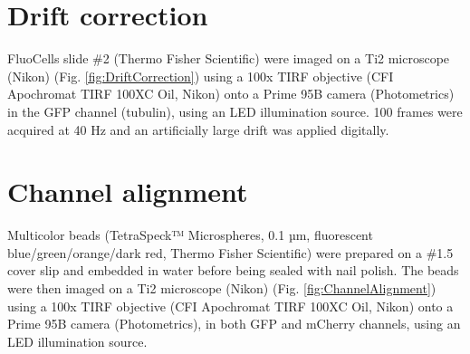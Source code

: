 

\onecolumn %
\fancyhead{} %
\renewcommand{\floatpagefraction}{0.1}
\lfoot[\bSupInf]{\dAuthor}
\rfoot[\dAuthor]{\cSupInf}
\newpage

\captionsetup*{format=largeformat} %
\setcounter{figure}{0} %
\setcounter{equation}{0} %
\setcounter{table}{0} %
\setcounter{page}{1} %
\makeatletter
\renewcommand{\thefigure}{S\@arabic\c@figure} %
\makeatother
\makeatletter
\renewcommand{\thetable}{S\@arabic\c@table} %
\makeatother
\makeatletter
\renewcommand{\theequation}{S\@arabic\c@equation} %
\makeatother




\tableofcontents

\newpage
\section{Drift correction}
FluoCells slide \#2 (Thermo Fisher Scientific) were imaged on a Ti2 microscope (Nikon) (Fig. \ref{fig:DriftCorrection}) using a 100x TIRF objective (CFI Apochromat TIRF 100XC Oil, Nikon) onto a Prime 95B camera (Photometrics) in the GFP channel (tubulin), using an LED illumination source. 100 frames were acquired at 40 Hz and an artificially large drift was applied digitally.


\section{Channel alignment}

Multicolor beads (TetraSpeck™ Microspheres, 0.1 µm, fluorescent blue/green/orange/dark red, Thermo Fisher Scientific) were prepared on a \#1.5 cover slip and embedded in water before being sealed with nail polish. The beads were then imaged on a Ti2 microscope (Nikon) (Fig. \ref{fig:ChannelAlignment}) using a 100x TIRF objective (CFI Apochromat TIRF 100XC Oil, Nikon) onto a Prime 95B camera (Photometrics), in both GFP and mCherry channels, using an LED illumination source. 

